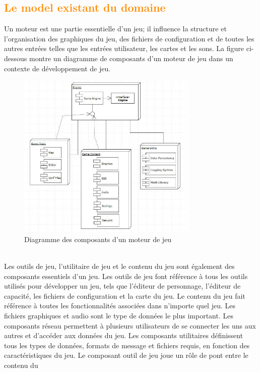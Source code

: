 \documentclass[ebook, 8pt, oneside, openany]{memoir}
\begin{document}
	\subsection{\textcolor{darkorange}{Le model existant du domaine}}
	Un moteur est une partie essentielle d'un jeu; il influence la structure et l'organisation des
	graphiques du jeu, des fichiers de configuration et de toutes les autres entrées telles que les entrées
	utilisateur, les cartes et les sons. La figure ci-dessous montre un diagramme de composants d'un moteur
	de jeu dans un contexte de développement de jeu.
	\begin{figure}[h]
		\begin{center}\includegraphics[height = 225pt]{game_engine_components_diagram.png}\end{center}
		\caption{Diagramme des composants d'un moteur de jeu}
		\label{Diagramme des composants d'un moteur de jeu}
	\end{figure}
	\\Les outils de jeu, l'utilitaire de jeu et le contenu du jeu sont également des composants essentiels
	d'un jeu. Les outils de jeu font référence à tous les outils utilisés pour développer un jeu, tels que 
	l'éditeur de personnage, l'éditeur de capacité, les fichiers de configuration et la carte du jeu. Le
	contenu du jeu fait référence à toutes les fonctionnalités associées dans n'importe quel jeu. Les
	fichiers graphiques et audio sont le type de données le plus important. Les composants réseau permettent
	à plusieurs utilisateurs de se connecter les uns aux autres et d'accéder aux données du jeu. Les
	composants utilitaires définissent tous les types de données, formats de message et fichiers requis, en
	fonction des caractéristiques du jeu. Le composant outil de jeu joue un rôle de pont entre le contenu du
\end{document}

